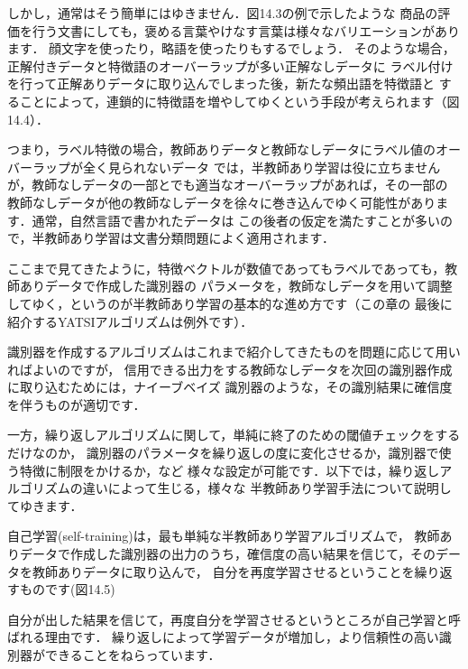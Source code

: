 

しかし，通常はそう簡単にはゆきません．図14.3の例で示したような
商品の評価を行う文書にしても，褒める言葉やけなす言葉は様々なバリエーションがあります．
顔文字を使ったり，略語を使ったりもするでしょう．
そのような場合，正解付きデータと特徴語のオーバーラップが多い正解なしデータに
ラベル付けを行って正解ありデータに取り込んでしまった後，新たな頻出語を特徴語と
することによって，連鎖的に特徴語を増やしてゆくという手段が考えられます（図14.4）．


つまり，ラベル特徴の場合，教師ありデータと教師なしデータにラベル値のオーバーラップが全く見られないデータ
では，半教師あり学習は役に立ちませんが，教師なしデータの一部とでも適当なオーバーラップがあれば，その一部の
教師なしデータが他の教師なしデータを徐々に巻き込んでゆく可能性があります．通常，自然言語で書かれたデータは
この後者の仮定を満たすことが多いので，半教師あり学習は文書分類問題によく適用されます．



ここまで見てきたように，特徴ベクトルが数値であってもラベルであっても，教師ありデータで作成した識別器の
パラメータを，教師なしデータを用いて調整してゆく，というのが半教師あり学習の基本的な進め方です（この章の
最後に紹介するYATSIアルゴリズムは例外です）．

識別器を作成するアルゴリズムはこれまで紹介してきたものを問題に応じて用いればよいのですが，
信用できる出力をする教師なしデータを次回の識別器作成に取り込むためには，ナイーブベイズ
識別器のような，その識別結果に確信度を伴うものが適切です．

一方，繰り返しアルゴリズムに関して，単純に終了のための閾値チェックをするだけなのか，
識別器のパラメータを繰り返しの度に変化させるか，識別器で使う特徴に制限をかけるか，など
様々な設定が可能です．以下では，繰り返しアルゴリズムの違いによって生じる，様々な
半教師あり学習手法について説明してゆきます．



自己学習(self-training)は，最も単純な半教師あり学習アルゴリズムで，
教師ありデータで作成した識別器の出力のうち，確信度の高い結果を信じて，そのデータを教師ありデータに取り込んで，
自分を再度学習させるということを繰り返すものです(図14.5)


自分が出した結果を信じて，再度自分を学習させるというところが自己学習と呼ばれる理由です．
繰り返しによって学習データが増加し，より信頼性の高い識別器ができることをねらっています．

